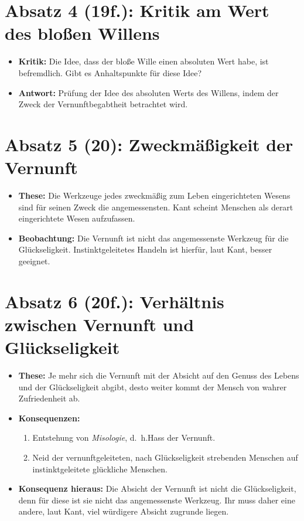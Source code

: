 \documentclass{llncs}
\begin{document}
\section*{Absatz 4 (19f.): Kritik am Wert des bloßen Willens}

\begin{itemize}
    \item \textbf{Kritik:} Die Idee, dass der bloße Wille einen absoluten Wert habe, ist befremdlich.
		Gibt es Anhaltspunkte für diese Idee?
	\item \textbf{Antwort:} Prüfung der Idee des absoluten Werts des Willens, indem der Zweck der Vernunftbegabtheit betrachtet wird.
\end{itemize}

\section*{Absatz 5 (20): Zweckmäßigkeit der Vernunft}

\begin{itemize}
    \item \textbf{These:} Die Werkzeuge jedes zweckmäßig zum Leben eingerichteten Wesens sind für seinen Zweck die angemessensten.
		Kant scheint Menschen als derart eingerichtete Wesen aufzufassen.
	\item \textbf{Beobachtung:} Die Vernunft ist nicht das angemessenste Werkzeug für die Glückseligkeit.
		Instinktgeleitetes Handeln ist hierfür, laut Kant, besser geeignet.
\end{itemize}

\section*{Absatz 6 (20f.): Verhältnis zwischen Vernunft und Glückseligkeit}

\begin{itemize}
	\item \textbf{These:} Je mehr sich die Vernunft mit der Absicht auf den Genuss des Lebens und der Glückseligkeit abgibt, desto weiter kommt der Mensch von wahrer Zufriedenheit ab.
	\item \textbf{Konsequenzen:}
		\begin{enumerate}
			\item Entstehung von \textit{Misologie}, d.~h.\@ Hass der Vernunft.
			\item Neid der vernunftgeleiteten, nach Glückseligkeit strebenden Menschen auf instinktgeleitete glückliche Menschen.
		\end{enumerate}
	\item \textbf{Konsequenz hieraus:} Die Absicht der Vernunft ist nicht die Glückseligkeit, denn für diese ist sie nicht das angemessenste Werkzeug.
		Ihr muss daher eine andere, laut Kant, viel würdigere Absicht zugrunde liegen.
\end{itemize}
\end{document}
